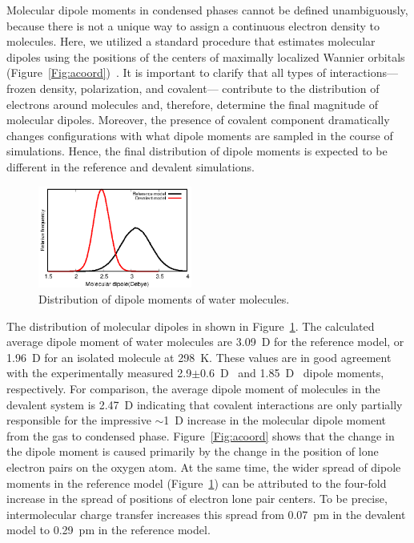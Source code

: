 \documentclass[journal=jacsat,manuscript=article]{achemso}
\begin{document}

Molecular dipole moments in condensed phases cannot be defined unambiguously, because there is not a unique way to assign a continuous electron density to molecules.
Here, we utilized a standard procedure that estimates molecular dipoles using the positions of the centers of maximally localized Wannier orbitals (Figure~\ref{Fig:acoord})~\cite{marzari1997maximally,sharma2007dipolar}. 
It is important to clarify that all types of interactions---frozen density, polarization, and covalent--- contribute to the distribution of electrons around molecules and, therefore, determine the final magnitude of molecular dipoles. 
Moreover, the presence of covalent component dramatically changes configurations with what dipole moments are sampled in the course of simulations. 
Hence, the final distribution of dipole moments is expected to be different in the reference and devalent simulations. 

\begin{figure}
\includegraphics[width=0.45\textwidth]{new_dipole}
\caption{Distribution of dipole moments of water molecules.} \label{Fig:dipoledist}
\end{figure}

The distribution of molecular dipoles in shown in Figure~\ref{Fig:dipoledist}.  
The calculated average dipole moment of water molecules are 3.09~D for the reference model, or 1.96~D for an isolated molecule at 298~K.
These values are in good agreement with the experimentally measured 2.9$\pm$0.6~D~\cite{badyal2000electron} and 1.85~D~\cite{haynes2014crc} dipole moments, respectively. 
For comparison, the average dipole moment of molecules in the devalent system is 2.47~D indicating that covalent interactions are only partially responsible for the impressive $\sim$1~D increase in the molecular dipole moment from the gas to condensed phase. 
Figure~\ref{Fig:acoord} shows that the change in the dipole moment is caused primarily by the change in the position of lone electron pairs on the oxygen atom. 
At the same time, the wider spread of dipole moments in the reference model (Figure~\ref{Fig:dipoledist}) can be attributed to the four-fold increase in the spread of positions of electron lone pair centers. 
To be precise, intermolecular charge transfer increases this spread from 0.07~pm in the devalent model to 0.29~pm in the reference model.
%
\end{document}
